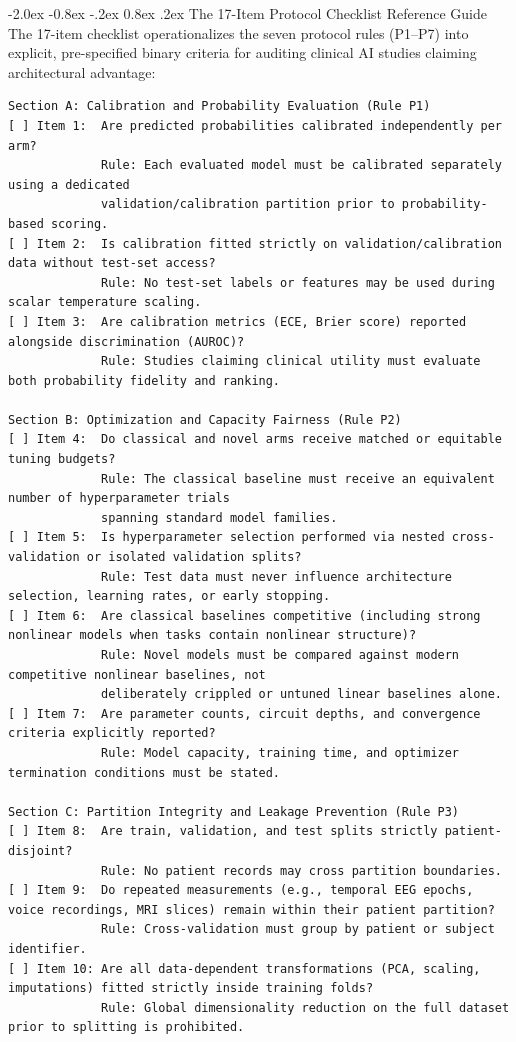 \documentclass[10pt,a4paper]{article}
\makeatletter
\renewcommand{\subsection}{\@startsection{subsection}{2}{\z@}%
  {-2.0ex \@plus -0.8ex \@minus -.2ex}%
  {0.8ex \@plus.2ex}%
  {\normalfont\large\sffamily\bfseries\color{naturedark}}}
\makeatother
\begin{document}
\subsection{The 17-Item Protocol Checklist Reference Guide}
The 17-item checklist operationalizes the seven protocol rules (P1--P7) into explicit, pre-specified binary criteria for auditing clinical AI studies claiming architectural advantage:

\begin{lstlisting}
Section A: Calibration and Probability Evaluation (Rule P1)
[ ] Item 1:  Are predicted probabilities calibrated independently per arm?
             Rule: Each evaluated model must be calibrated separately using a dedicated 
             validation/calibration partition prior to probability-based scoring.
[ ] Item 2:  Is calibration fitted strictly on validation/calibration data without test-set access?
             Rule: No test-set labels or features may be used during scalar temperature scaling.
[ ] Item 3:  Are calibration metrics (ECE, Brier score) reported alongside discrimination (AUROC)?
             Rule: Studies claiming clinical utility must evaluate both probability fidelity and ranking.

Section B: Optimization and Capacity Fairness (Rule P2)
[ ] Item 4:  Do classical and novel arms receive matched or equitable tuning budgets?
             Rule: The classical baseline must receive an equivalent number of hyperparameter trials 
             spanning standard model families.
[ ] Item 5:  Is hyperparameter selection performed via nested cross-validation or isolated validation splits?
             Rule: Test data must never influence architecture selection, learning rates, or early stopping.
[ ] Item 6:  Are classical baselines competitive (including strong nonlinear models when tasks contain nonlinear structure)?
             Rule: Novel models must be compared against modern competitive nonlinear baselines, not 
             deliberately crippled or untuned linear baselines alone.
[ ] Item 7:  Are parameter counts, circuit depths, and convergence criteria explicitly reported?
             Rule: Model capacity, training time, and optimizer termination conditions must be stated.

Section C: Partition Integrity and Leakage Prevention (Rule P3)
[ ] Item 8:  Are train, validation, and test splits strictly patient-disjoint?
             Rule: No patient records may cross partition boundaries.
[ ] Item 9:  Do repeated measurements (e.g., temporal EEG epochs, voice recordings, MRI slices) remain within their patient partition?
             Rule: Cross-validation must group by patient or subject identifier.
[ ] Item 10: Are all data-dependent transformations (PCA, scaling, imputations) fitted strictly inside training folds?
             Rule: Global dimensionality reduction on the full dataset prior to splitting is prohibited.


\end{lstlisting}
\end{document}
